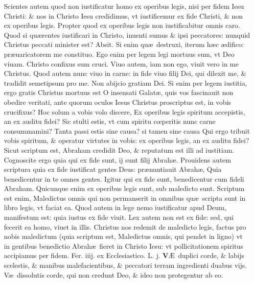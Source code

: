 \documentclass[a5paper,10pt]{book}
\def\leftmarginnote{%
	\lrmarginnote{\hskip -\marginparsep \hskip -6.5em}}
\def\rightmarginnote{%
	\lrmarginnote{\hskip\columnwidth \hskip -1em}}
\def\ae{æ}
\def\AE{Æ}
\def\oe{œ}
\begin{document}
\begin{multicols*}{2}
Scientes autem quod non iustificatur homo ex operibus legis, nisi per fidem Iesu Christi: \& nos in Christo Iesu credidimus, vt iustificemur ex fide Christi, \& non ex operibus legis.
Propter quod ex operibus legis non
iustificabitur omnis caro.
Quod si qu\ae rentes iustificari in Christo, inuenti sumus \& ipsi peccatores: nunquid Christus peccati minister est? Absit.
Si enim qu\ae \ destruxi, iterum h\ae c \ae difico: pr\ae uaricatorem me constituo. Ego enim per legem legi mortuus sum, vt Deo viuam. Christo confixus sum cruci.
Viuo autem, iam non ego, viuit vero in me Christus. Quod autem nunc viuo in carne: in fide viuo filij Dei, qui dilexit me, \& tradidit semetipsum pro me.
Non abijcio gratiam Dei. Si enim per legem iustitia, ergo gratis Christus mortuus est
O\leftmarginnote{\begin{flushright}ca. 3.\end{flushright}} insensati Galat\ae , quis vos fascinauit non obedire veritati, ante quorum oculos Iesus Christus proscriptus est, in vobis crucifixus?
Hoc solum a vobis volo discere, Ex operibus legis spiritum accepistis, an ex auditu fidei? Sic stulti estis, vt cum spiritu c\oe peritis nunc carne consummamini?
Tanta passi estis sine causa? si tamen sine causa Qui ergo tribuit vobis spiritum, \& operatur virtutes in vobis: ex operibus legis, an ex auditu fidei?
Sicut scriptum est, Abraham credidit Deo, \& reputatum est illi ad iustitiam. Cognoscite ergo quia qui ex fide sunt, ij sunt filij Abrah\ae .
Prouidens autem scriptura quia ex fide iustificat gentes Deus: pr\ae nuntiauit Abrah\ae , Quia benedicentur in te omnes gentes.
Igitur qui ex fide sunt, benedicentur cum fideli Abraham. Quicunque enim ex operibus legis sunt, sub maledicto sunt.
Scriptum est enim, Maledictus omnis qui non permanserit in omnibus qu\ae \ scripta sunt in libro legis, vt faciat ea.
Quod autem in lege nemo iustificatur apud Deum, manifestum est: quia iustus ex fide viuit. Lex autem non est ex fide: sed, qui fecerit ea homo, viuet in illis.
Christus nos redemit de maledicto legis, factus pro nobis maledictum (quia scriptum est, Maledictus omnis, qui pendet in ligno) vt in gentibus benedictio Abrah\ae \ fieret in Christo Iesu: vt pollicitationem spiritus accipiamus per fidem.
\newline {} \color{red} \hypertarget{WED-PRIMA-VAGAN}{Fer. iiij.} ex Ecclesiastico. L. j. \color{black}
\vspace{-.25em}
\lettrine[lines=2]{\bfseries V}{}\AE \ duplici\rightmarginnote{ca. 2.} corde, \& labijs scelestis, \& manibus malefacientibus, \& peccatori terram ingredienti duabus vijs. V\ae \ dissolutis corde, qui non credunt Deo, \& ideo non protegentur ab eo.

\end{multicols*}
\end{document}
